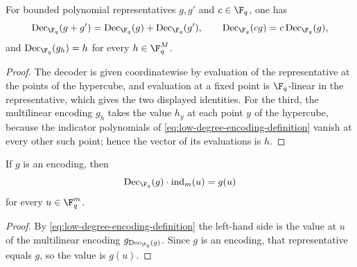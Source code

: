 \begin{lemma}\label{lem:qld-decoder-linearity}
	\leanok
	For bounded polynomial representatives $g,g'$ and $c\in\F_q$, one has
	\[
		\mathrm{Dec}_{\F_q}(g+g')=\mathrm{Dec}_{\F_q}(g)+\mathrm{Dec}_{\F_q}(g'),
		\qquad
		\mathrm{Dec}_{\F_q}(cg)=c\,\mathrm{Dec}_{\F_q}(g),
	\]
	and $\mathrm{Dec}_{\F_q}(g_h)=h$ for every $h\in\F_q^M$.
\end{lemma}
\begin{proof}
	\leanok
	The decoder is given coordinatewise by evaluation of the representative at the points of the hypercube, and evaluation at a fixed point is $\F_q$-linear in the representative, which gives the two displayed identities. For the third, the multilinear encoding $g_h$ takes the value $h_y$ at each point $y$ of the hypercube, because the indicator polynomials of \eqref{eq:low-degree-encoding-definition} vanish at every other such point; hence the vector of its evaluations is $h$.
\end{proof}

\begin{lemma}\label{lem:qld-decoder-evaluation}
	\leanok
	If $g$ is an encoding, then
	\[
		\mathrm{Dec}_{\F_q}(g)\cdot\mathrm{ind}_m(u)=g(u)
	\]
	for every $u\in\F_q^m$.
\end{lemma}
\begin{proof}
	\leanok
	By \eqref{eq:low-degree-encoding-definition} the left-hand side is the value at $u$ of the multilinear encoding $g_{\mathrm{Dec}_{\F_q}(g)}$. Since $g$ is an encoding, that representative equals $g$, so the value is $g(u)$.
\end{proof}

